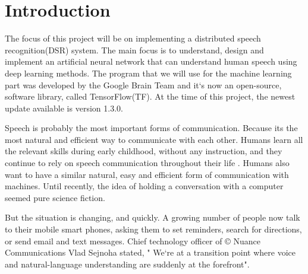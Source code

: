 \chapter{Introduction}\label{ch:introduction}

The focus of this project will be on implementing a distributed speech recognition(DSR) system.
 The main focus is to understand, design and implement an artificial neural network that can understand human speech using deep learning methods. 
 The program that we will use for the machine learning part was developed by the Google Brain Team and it`s now an open-source, software library, called TensorFlow(TF). 
 At the time of this project, the newest update available is version 1.3.0. \cite{tensorflow2015-whitepaper}

Speech is probably the most important forms of communication. Because its the most natural and efficient way to communicate with each other. Humans learn all the relevant skills during early childhood, without any instruction, and they continue to rely on speech communication throughout their life \cite{kamblespeech}. Humans also want to have a similar natural, easy and efficient form of communication with machines. Until recently, the idea of holding a conversation with a computer seemed pure science fiction.

But the situation is changing, and quickly. A growing number of people now talk to their mobile smart phones, asking them to set reminders, search for directions, or send email and text messages. Chief technology officer of \copyright{} Nuance Communications Vlad Sejnoha stated, 
" We`re at a transition point where voice and natural-language understanding are suddenly at the forefront".




\cite{kamblespeech}
 






